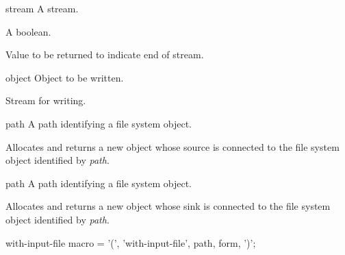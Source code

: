 \begin{optDefinition}
\begin{arguments}
    \item[stream] A stream.
    \item[\optional{eos-error-p}] A boolean.
    \item[\optional{eos-value}] Value to be returned to indicate end of stream.
\end{arguments}

\begin{arguments}
    \item[object] Object to be written.
    \item[\optional{stream}] Stream for writing.
\end{arguments}


\begin{arguments}
    \item[path] A path identifying a file system object.
\end{arguments}
%
\result%
Allocates and returns a new  object whose source
is connected to the file system object identified by {\em path}.

\begin{arguments}
    \item[path] A path identifying a file system object.
\end{arguments}
%
\result%
Allocates and returns a new  object whose sink is
connected to the file system object identified by {\em path}.

\Syntax
\savesyntax\withinputfileSyntax\vbox{\small\syntax
with-input-file macro
   = '(', 'with-input-file', path,  {form}, ')';
\endsyntax}


\end{optDefinition}

